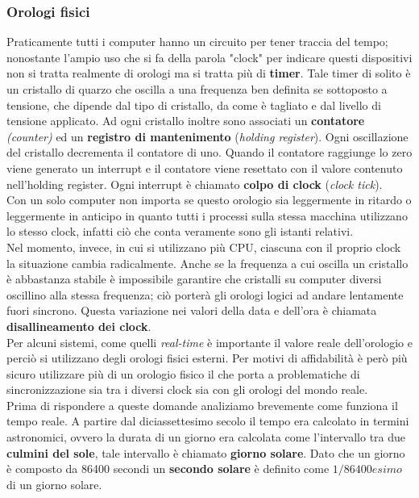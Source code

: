 \subsubsection{Orologi fisici}
Praticamente tutti i computer hanno un circuito per tener traccia del tempo; nonostante l'ampio uso che si fa della parola "clock" per indicare questi dispositivi non si tratta realmente di orologi ma si tratta più di \textbf{timer}.
Tale timer di solito è un cristallo di quarzo che oscilla a una frequenza ben definita se sottoposto a tensione, che dipende dal tipo di cristallo, da come è tagliato e dal livello di tensione applicato. Ad ogni cristallo inoltre sono associati un \textbf{contatore} \emph{(counter)} ed un \textbf{registro di mantenimento} (\emph{holding register}). Ogni oscillazione del cristallo decrementa il contatore di uno. Quando il contatore raggiunge lo zero viene generato un interrupt e il contatore viene resettato con il valore contenuto nell'holding register. Ogni interrupt è chiamato \textbf{colpo di clock} (\emph{clock tick}).\\
Con un solo computer non importa se questo orologio sia leggermente in ritardo o leggermente in anticipo in quanto tutti i processi sulla stessa macchina utilizzano lo stesso clock, infatti ciò che conta veramente sono gli istanti relativi.\\
Nel momento, invece, in cui si utilizzano più CPU, ciascuna con il proprio clock la situazione cambia radicalmente. Anche se la frequenza a cui oscilla un cristallo è abbastanza stabile è impossibile garantire che cristalli su computer diversi oscillino alla stessa frequenza; ciò porterà gli orologi logici ad andare lentamente fuori sincrono. Questa variazione nei valori della data e dell'ora è chiamata \textbf{disallineamento dei clock}.\\
Per alcuni sistemi, come quelli \emph{real-time} è importante il valore reale dell'orologio e perciò si utilizzano degli orologi fisici esterni. Per motivi di affidabilità è però più sicuro utilizzare più di un orologio fisico il che porta a problematiche di sincronizzazione sia tra i diversi clock sia con gli orologi del mondo reale.\\
Prima di rispondere a queste domande analiziamo brevemente come funziona il tempo reale. A partire dal diciassettesimo secolo il tempo era calcolato in termini astronomici, ovvero la durata di un giorno era calcolata come l'intervallo tra due \textbf{culmini del sole}, tale intervallo è chiamato \textbf{giorno solare}. Dato che un giorno è composto da 86400 secondi un \textbf{secondo solare} è definito come $1/86400esimo$ di un giorno solare.\\
